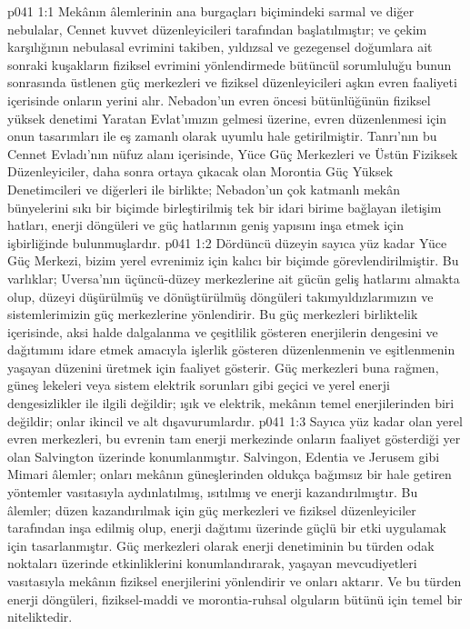 \vs p041 1:1 Mekânın âlemlerinin ana burgaçları biçimindeki sarmal ve diğer nebulalar, Cennet kuvvet düzenleyicileri tarafından başlatılmıştır; ve çekim karşılığının nebulasal evrimini takiben, yıldızsal ve gezegensel doğumlara ait sonraki kuşakların fiziksel evrimini yönlendirmede bütüncül sorumluluğu bunun sonrasında üstlenen güç merkezleri ve fiziksel düzenleyicileri aşkın evren faaliyeti içerisinde onların yerini alır. Nebadon’un evren öncesi bütünlüğünün fiziksel yüksek denetimi Yaratan Evlat’ımızın gelmesi üzerine, evren düzenlenmesi için onun tasarımları ile eş zamanlı olarak uyumlu hale getirilmiştir. Tanrı’nın bu Cennet Evladı’nın nüfuz alanı içerisinde, Yüce Güç Merkezleri ve Üstün Fiziksek Düzenleyiciler, daha sonra ortaya çıkacak olan Morontia Güç Yüksek Denetimcileri ve diğerleri ile birlikte; Nebadon’un çok katmanlı mekân bünyelerini sıkı bir biçimde birleştirilmiş tek bir idari birime bağlayan iletişim hatları, enerji döngüleri ve güç hatlarının geniş yapısını inşa etmek için işbirliğinde bulunmuşlardır.
\vs p041 1:2 Dördüncü düzeyin sayıca yüz kadar Yüce Güç Merkezi, bizim yerel evrenimiz için kalıcı bir biçimde görevlendirilmiştir. Bu varlıklar; Uversa’nın üçüncü\hyp{}düzey merkezlerine ait gücün geliş hatlarını almakta olup, düzeyi düşürülmüş ve dönüştürülmüş döngüleri takımyıldızlarımızın ve sistemlerimizin güç merkezlerine yönlendirir. Bu güç merkezleri birliktelik içerisinde, aksi halde dalgalanma ve çeşitlilik gösteren enerjilerin dengesini ve dağıtımını idare etmek amacıyla işlerlik gösteren düzenlenmenin ve eşitlenmenin yaşayan düzenini üretmek için faaliyet gösterir. Güç merkezleri buna rağmen, güneş lekeleri veya sistem elektrik sorunları gibi geçici ve yerel enerji dengesizlikler ile ilgili değildir; ışık ve elektrik, mekânın temel enerjilerinden biri değildir; onlar ikincil ve alt dışavurumlardır.
\vs p041 1:3 Sayıca yüz kadar olan yerel evren merkezleri, bu evrenin tam enerji merkezinde onların faaliyet gösterdiği yer olan Salvington üzerinde konumlanmıştır. Salvingon, Edentia ve Jerusem gibi Mimari âlemler; onları mekânın güneşlerinden oldukça bağımsız bir hale getiren yöntemler vasıtasıyla aydınlatılmış, ısıtılmış ve enerji kazandırılmıştır. Bu âlemler; düzen kazandırılmak için güç merkezleri ve fiziksel düzenleyiciler tarafından inşa edilmiş olup, enerji dağıtımı üzerinde güçlü bir etki uygulamak için tasarlanmıştır. Güç merkezleri olarak enerji denetiminin bu türden odak noktaları üzerinde etkinliklerini konumlandırarak, yaşayan mevcudiyetleri vasıtasıyla mekânın fiziksel enerjilerini yönlendirir ve onları aktarır. Ve bu türden enerji döngüleri, fiziksel\hyp{}maddi ve morontia\hyp{}ruhsal olguların bütünü için temel bir niteliktedir.
